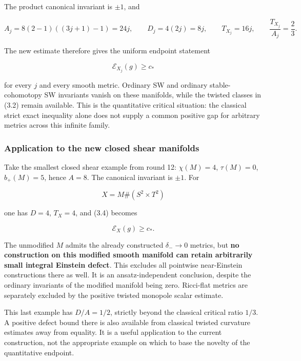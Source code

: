 \documentclass[
  10pt,
]{article}
\begin{document}
The product canonical invariant is \(\pm1\), and

\[
 A_j=8(2-1)((3j+1)-1)=24j,\qquad
 D_j=4(2j)=8j,\qquad
 T_{X_j}=16j,\qquad \frac{T_{X_j}}{A_j}=\frac23.
\]

The new estimate therefore gives the uniform endpoint statement

\[
                  \boxed{\mathcal E_{X_j}(g)\ge c_*}
\]

for every \(j\) and every smooth metric. Ordinary SW and ordinary
stable-cohomotopy SW invariants vanish on these manifolds, while the
twisted classes in (3.2) remain available. This is the quantitative
critical situation: the classical strict exact inequality alone does not
supply a common positive gap for arbitrary metrics across this infinite
family.

\hypertarget{application-to-the-new-closed-shear-manifolds}{%
\subsubsection{Application to the new closed shear
manifolds}\label{application-to-the-new-closed-shear-manifolds}}

Take the smallest closed shear example from round 12: \(\chi(M)=4\),
\(\tau(M)=0\), \(b_+(M)=5\), hence \(A=8\). The canonical invariant is
\(\pm1\). For

\[
                         X=M\#(S^2\times T^2)
\]

one has \(D=4\), \(T_X=4\), and (3.4) becomes

\[
                          \mathcal E_X(g)\ge c_* .      \tag{3.5}
\]

The unmodified \(M\) admits the already constructed \(\delta_-\to0\)
metrics, but \textbf{no construction on this modified smooth manifold
can retain arbitrarily small integral Einstein defect}. This excludes
all pointwise near-Einstein constructions there as well. It is an
ansatz-independent conclusion, despite the ordinary invariants of the
modified manifold being zero. Ricci-flat metrics are separately excluded
by the positive twisted monopole scalar estimate.

This last example has \(D/A=1/2\), strictly beyond the classical
critical ratio \(1/3\). A positive defect bound there is also available
from classical twisted curvature estimates away from equality. It is a
useful application to the current construction, not the appropriate
example on which to base the novelty of the quantitative endpoint.
\end{document}
